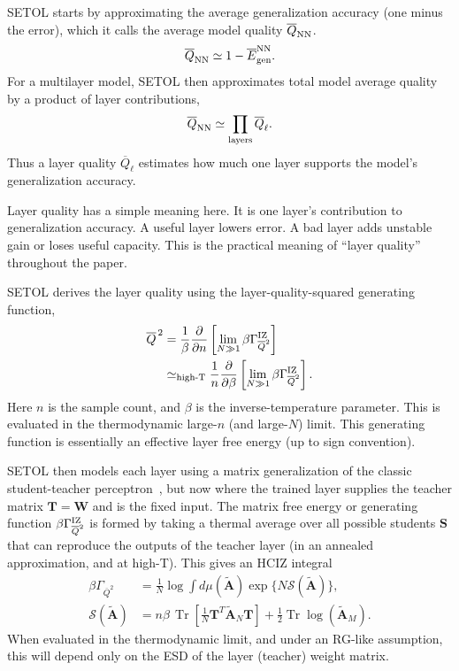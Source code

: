 \documentclass[10pt,twocolumn]{article}
\newcommand{\Tr}{\operatorname{Tr}}
\begin{document}
SETOL starts by approximating the average generalization accuracy (one minus the error),
which it calls the average model quality $\overline Q_{\rm NN}$.
\begin{equation}
\overline Q_{\rm NN}\simeq 1-\overline E_{\rm gen}^{\rm NN}.
\label{eq:setol_quality}
\end{equation}
For a multilayer model, SETOL then approximates total model average quality by a product of layer contributions,
\begin{equation}
\overline Q_{\rm NN}\simeq\prod_{\rm layers}\overline Q_\ell .
\label{eq:setol_layer_product}
\end{equation}
Thus a layer quality $\overline Q_\ell$ estimates how much one layer supports the model's generalization accuracy.

Layer quality has a simple meaning here. It is one layer's contribution to generalization accuracy. A useful layer lowers error. A bad layer adds unstable gain or loses useful capacity.
This is the practical meaning of ``layer quality'' throughout the paper.

SETOL derives the layer quality using the layer-quality-squared generating function,
\begin{equation}
\begin{aligned}
\overline Q^{\,2}
&=\frac{1}{\beta}\frac{\partial}{\partial n}
  \left[\lim_{N\gg1}\beta\Gamma_{\overline Q^2}^{\rm IZ}\right] \\
&\simeq_{\rm high\text{-}T}
  \frac{1}{n}\frac{\partial}{\partial\beta}
  \left[\lim_{N\gg1}\beta\Gamma_{\overline Q^2}^{\rm IZ}\right] .
\end{aligned}
\label{eq:setol_q_derivative}
\end{equation}
Here $n$ is the sample count, and $\beta$ is the inverse-temperature parameter.
This is evaluated in the thermodynamic large-$n$ (and large-$N$) limit.
This generating function is essentially an effective layer free energy (up to sign convention).

SETOL then models each layer using a matrix generalization of the classic student-teacher perceptron~\cite{SeungSompolinskyTishby1992},
but now where the trained layer supplies the teacher matrix $\mathbf{T}=\mathbf{W}$ and is the fixed input.
The matrix free energy or generating function $\beta\Gamma_{\overline Q^2}^{\rm IZ}$
is formed by taking a thermal average over all possible students $\mathbf{S}$ that can
reproduce the outputs of the teacher layer (in an annealed approximation, and at high-T).
This gives an HCIZ integral
\begin{equation}
\begin{aligned}
\beta\Gamma_{\overline Q^2}
&=\frac{1}{N}\log\int d\mu(\widetilde{\mathbf A})
   \exp\{N\mathcal S(\widetilde{\mathbf A})\},\\
\mathcal S(\widetilde{\mathbf A})
&=n\beta\,\Tr\!\left[
   \frac{1}{N}\mathbf T^T\widetilde{\mathbf A}_{N}\mathbf T
   \right]
   +\frac{1}{2}\Tr\log(\widetilde{\mathbf A}_{M}) .
\end{aligned}
\label{eq:setol_hciz}
\end{equation}
When evaluated in the thermodynamic limit, and under an RG-like assumption,
this will depend only on the ESD of the layer (teacher) weight matrix.
\end{document}
